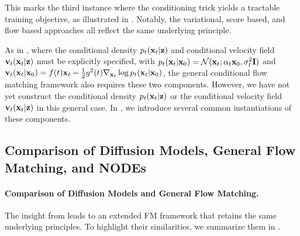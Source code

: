 This marks the third instance where the conditioning trick yields a tractable training objective, as illustrated in . Notably, the variational, score based, and flow based approaches all reflect the same underlying principle.




As in , where the conditional density $p_t({\mathbf{x}}_t|{\mathbf{z}})$ and conditional velocity field ${\mathbf{v}}_t({\mathbf{x}}_t|{\mathbf{z}})$ must be explicitly specified, with $p_t({\mathbf{x}}_t|{\mathbf{x}}_0) = \mathcal{N}({\mathbf{x}}_t; \alpha_t {\mathbf{x}}_0, \sigma_t^2 {\mathbf{I}})$ and ${\mathbf{v}}_t({\mathbf{x}}_t|{\mathbf{x}}_0) = f(t){\mathbf{x}}_t - \frac{1}{2}g^2(t)\nabla_{{\mathbf{x}}_t} \log p_t({\mathbf{x}}_t|{\mathbf{x}}_0)$, the general conditional flow matching framework also requires these two components. However, we have not yet construct the conditional density $p_t({\mathbf{x}}_t|{\mathbf{z}})$ or the conditional velocity field ${\mathbf{v}}_t({\mathbf{x}}_t|{\mathbf{z}})$ in this general case. In , we introduce several common instantiations of these components.


\subsection{Comparison of Diffusion Models, General Flow Matching, and NODEs}\label{subsec:compare-dm-general-fm}


\paragraph{Comparison of Diffusion Models and General Flow Matching.}
The insight from  leads to an extended FM framework that retains the same underlying principles. To highlight their similarities, we summarize them in .


